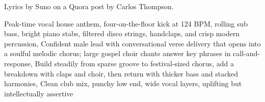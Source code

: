 
\begin{notes}
Lyrics by Suno on a Quora post by Carlos Thompson.
\end{notes}
\begin{style}
Peak-time vocal house anthem, four-on-the-floor kick at 124 BPM, rolling sub bass, bright piano stabs, filtered disco strings, handclaps, and crisp modern percussion, Confident male lead with conversational verse delivery that opens into a soulful melodic chorus; large gospel choir chants answer key phrases in call-and-response, Build steadily from sparse groove to festival-sized chorus, add a breakdown with claps and choir, then return with thicker bass and stacked harmonies, Clean club mix, punchy low end, wide vocal layers, uplifting but intellectually assertive
\end{style}

